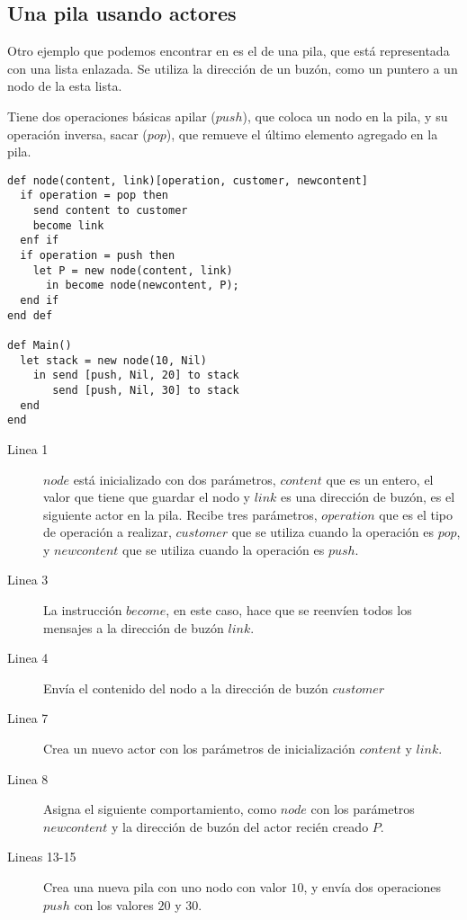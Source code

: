 \subsection{Una pila usando actores}

Otro ejemplo que podemos encontrar en \cite{Agha:1986:AMC:7929} es el de una pila, que está representada con una lista enlazada. Se utiliza la dirección de un buzón, como un puntero a un nodo de la esta lista. 

Tiene dos operaciones básicas apilar ($push$), que coloca un nodo en la pila, y su operación inversa, sacar ($pop$), que remueve el último elemento agregado en la pila.

\begin{lstlisting}[language=sal, style=simple]
def node(content, link)[operation, customer, newcontent]
  if operation = pop then
    send content to customer
    become link
  enf if
  if operation = push then
    let P = new node(content, link)
      in become node(newcontent, P);
  end if
end def

def Main() 
  let stack = new node(10, Nil)
    in send [push, Nil, 20] to stack 
       send [push, Nil, 30] to stack
  end
end
\end{lstlisting}

\begin{description}

\item [Linea 1] $node$ está inicializado con dos parámetros, $content$ que es un entero, el valor que tiene que guardar el nodo y  $link$ es una dirección de buzón, es el siguiente actor en la pila. Recibe tres parámetros, $operation$ que es el tipo de operación a realizar,  $customer$ que se utiliza cuando la operación es $pop$, y $newcontent$ que se utiliza cuando la operación es $push$.
\item [Linea 3] La instrucción $become$, en este caso, hace que se reenvíen todos los mensajes a la dirección de buzón $link$. 
\item [Linea 4] Envía el contenido del nodo a la dirección de buzón $customer$
\item [Linea 7] Crea un nuevo actor con los parámetros de inicialización $content$ y $link$.
\item [Linea 8] Asigna el siguiente comportamiento, como $node$ con los parámetros $newcontent$ y la dirección de buzón del actor recién creado $P$. 
\item [Lineas 13-15] Crea una nueva pila con uno nodo con valor $10$, y envía dos operaciones $push$ con los valores $20$ y $30$.
\end{description}

